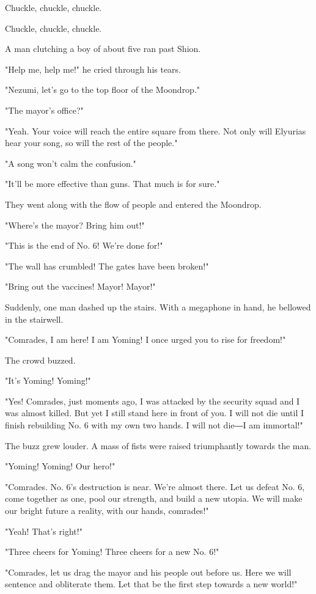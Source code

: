 Chuckle, chuckle, chuckle.

Chuckle, chuckle, chuckle.

A man clutching a boy of about five ran past Shion.

"Help me, help me!" he cried through his tears.

"Nezumi, let's go to the top floor of the Moondrop."

"The mayor's office?"

"Yeah. Your voice will reach the entire square from there. Not only will
Elyurias hear your song, so will the rest of the people."

"A song won't calm the confusion."

"It'll be more effective than guns. That much is for sure."

They went along with the flow of people and entered the Moondrop.

"Where's the mayor? Bring him out!"

"This is the end of No. 6! We're done for!"

"The wall has crumbled! The gates have been broken!"

"Bring out the vaccines! Mayor! Mayor!"

Suddenly, one man dashed up the stairs. With a megaphone in hand, he
bellowed in the stairwell.

"Comrades, I am here! I am Yoming! I once urged you to rise for
freedom!"

The crowd buzzed.

"It's Yoming! Yoming!"

"Yes! Comrades, just moments ago, I was attacked by the security squad
and I was almost killed. But yet I still stand here in front of you. I
will not die until I finish rebuilding No. 6 with my own two hands. I
will not die―I am immortal!"

The buzz grew louder. A mass of fists were raised triumphantly towards
the man.

"Yoming! Yoming! Our hero!"

"Comrades. No. 6's destruction is near. We're almost there. Let us
defeat No. 6, come together as one, pool our strength, and build a new
utopia. We will make our bright future a reality, with our hands,
comrades!"

"Yeah! That's right!"

"Three cheers for Yoming! Three cheers for a new No. 6!"

"Comrades, let us drag the mayor and his people out before us. Here we
will sentence and obliterate them. Let that be the first step towards a
new world!"

